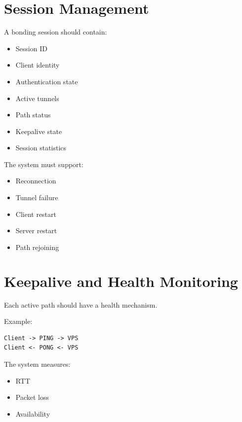 \documentclass[12pt,a4paper]{article}
\begin{document}

\section{Session Management}

A bonding session should contain:

\begin{itemize}
    \item Session ID
    \item Client identity
    \item Authentication state
    \item Active tunnels
    \item Path status
    \item Keepalive state
    \item Session statistics
\end{itemize}

The system must support:

\begin{itemize}
    \item Reconnection
    \item Tunnel failure
    \item Client restart
    \item Server restart
    \item Path rejoining
\end{itemize}


\section{Keepalive and Health Monitoring}

Each active path should have a health mechanism.

Example:

\begin{verbatim}
Client -> PING -> VPS
Client <- PONG <- VPS
\end{verbatim}

The system measures:

\begin{itemize}
    \item RTT
    \item Packet loss
    \item Availability
\end{itemize}
\end{document}
